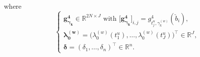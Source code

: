 \documentclass[11pt]{article}
\newcommand{\R}{\mathds R}
\begin{document}
where 
\begin{equation*}
  \left\{
    \begin{array}{ll}
    \boldsymbol{g^4_{\gamma_k}} \in \R^{2N \times J} \text{ with } \big[\boldsymbol{g^4_{\gamma_k}}\big]_{i, j} = g^4_{t_j^u, \gamma_k^{(w)}}(\breve{b}_i) , \\
    \boldsymbol{\lambda_0^{(w)}} = \big(\lambda_0^{(w)}(t_1^u), \ldots, \lambda_0^{(w)}(t_J^u) \big)^\top \in \R^J, \\
    \boldsymbol{\delta} = (\delta_1, \ldots, \delta_n)^\top \in \R^n.
    \end{array}
  \right. 
\end{equation*}



{}
\end{document}
